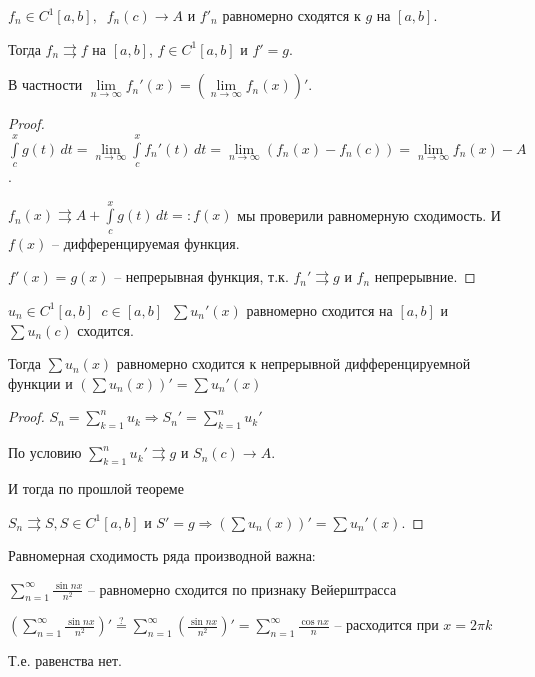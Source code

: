 
\begin{theorem}\slashns
    
    $f_n \in C^1[a,b], \;\; f_n(c) \to A$ и $f'_n$  равномерно сходятся к $g$ на $[a, b]$.
    
    Тогда $f_n \rightrightarrows f$ на $[a, b]$, $f \in C^1[a,b]$ и $f' = g$.
    
    В частности $\lim\limits_{n \to \infty} f_n'(x) = (\lim\limits_{n \to \infty} f_n(x))'$.
\end{theorem}

\begin{proof}\slashns
    
    $\int\limits_c^x g(t)\,dt = \lim\limits_{n \to \infty} \int\limits_c^x f_n'(t) \, dt = \lim\limits_{n \to \infty} (f_n(x) - f_n(c)) = \lim\limits_{n \to \infty} f_n(x) - A$.
    
    $f_n(x) \rightrightarrows A + \int\limits_c^x g(t)\,dt =: f(x)$ мы проверили равномерную сходимость. И $f(x)$ -- дифференцируемая функция.
    
    $f'(x) = g(x)$ -- непрерывная функция, т.к. $f_n' \rightrightarrows g$ и $f_n$ непрерывние.
\end{proof}

\begin{consequence}\slashns
    
    $u_n \in C^1[a,b] \;\; c \in [a,b] \;\; \sum u_n'(x)$ равномерно сходится на $[a, b]$ и $\sum u_n(c)$ сходится.
    
    Тогда $\sum u_n(x)$ равномерно сходится к непрерывной дифференцируемной функции и $\left( \sum u_n(x) \right)' = \sum u_n'(x)$
    
\end{consequence}

\begin{proof}\slashns
    
    $S_n = \sum\limits_{k = 1}^{n} u_k \Rightarrow S_n' = \sum\limits_{k = 1}^{n} u_k'$
    
    По условию $\sum\limits_{k = 1}^{n} u_k' \rightrightarrows g$ и $S_n(c) \to A$.
    
    И тогда по прошлой теореме 
    
    $S_n \rightrightarrows S, S \in C^1[a,b]$ и $S' = g \Rightarrow \left( \sum u_n(x) \right)' = \sum u_n'(x)$.
\end{proof}

\begin{example}\slashns
    
    
    Равномерная сходимость ряда производной важна:
    
    $\sum\limits_{n=1}^{\infty} \frac{\sin n x}{n^2}$ -- равномерно сходится по признаку Вейерштрасса
    
    $(\sum\limits_{n=1}^{\infty} \frac{\sin n x}{n^2})' \stackrel{?}{=} \sum\limits_{n=1}^{\infty} (\frac{\sin n x}{n^2})' = \sum\limits_{n= 1}^{\infty} \frac{\cos nx}{n}$ -- расходится при $x=2\pi k$
    
    Т.е. равенства нет.
\end{example}

